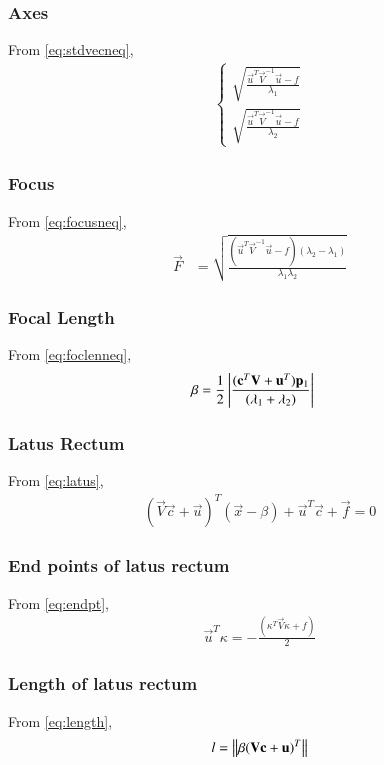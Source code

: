 \documentclass[journal,12pt,twocolumn]{IEEEtran}
\begin{document}
\subsubsection{Axes}
From \eqref{eq:stdvecneq},
\begin{align}
\begin{cases}
    \sqrt{\frac{\vec{u}^T\vec{V}^{-1}\vec{u}-f}{\lambda_1}}
    \\
    \sqrt{\frac{\vec{u}^T\vec{V}^{-1}\vec{u}-f}{\lambda_2}}
\end{cases}
\end{align}
\subsubsection{Focus}
From \eqref{eq:focusneq},
\begin{align}
    \vec{F} &= \sqrt{\frac{(\vec{u}^T\vec{V}^{-1}\vec{u}-f)(\lambda_2-\lambda_1)}{\lambda_1\lambda_2}}
\end{align}
\subsubsection{Focal Length}
From \eqref{eq:foclenneq},
\begin{align}
    \beta &= \frac{1}{2}\left\vert\frac{(\mathbf{c}^T\mathbf{V}+\mathbf{u}^T)\mathbf{p}_1}{(\lambda_1+\lambda_2)}\right\vert 
\end{align}
\subsubsection{Latus Rectum}
From \eqref{eq:latus},
\begin{align}
    (\vec{V}\vec{c}+\vec{u})^T(\vec{x} -\beta) + \vec{u}^T\vec{c} + \vec{f} = 0
\end{align}
\subsubsection{End points of latus rectum}
From \eqref{eq:endpt},
\begin{align}
    \vec{u}^T\kappa = -\frac{(\kappa^T\vec{V}\kappa + f )}{2}
\end{align}
\subsubsection{Length of latus rectum}
From \eqref{eq:length},
\begin{align}
   l=\left\lVert\beta(\mathbf{V}\mathbf{c}+\mathbf{u})^T\right\rVert 
\end{align}
\end{document}
